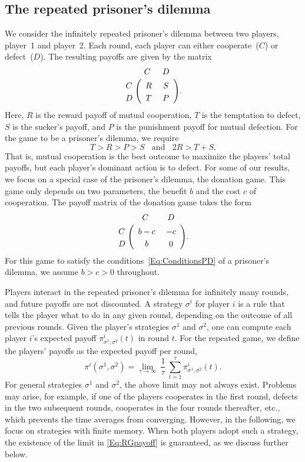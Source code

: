 \documentclass[9pt,twoside,lineno]{pnas-new}
\theoremstyle{plainCl1}
\theoremstyle{plainCl2}
\begin{document}
\subsection{The repeated prisoner's dilemma}


We consider the infinitely repeated prisoner's dilemma between two players, player~1 and player~2.
Each round, each player can either cooperate~($C$) or defect~($D$). 
The resulting payoffs are given by the matrix 
\begin{align}\label{Eq:PrisonerDilemma}
  \bordermatrix{%
    & C & D \cr
    C &\ R &\ S\  \cr
    D &\ T &\ P\ \cr
  }.
\end{align}
Here, $R$ is the reward payoff of mutual cooperation, $T$ is the temptation to defect, $S$ is the sucker's payoff, and $P$ is the punishment payoff for mutual defection. For the game to be a prisoner's dilemma, we require
\begin{equation} \label{Eq:ConditionsPD}
 T > R > P > S ~~~~\text{and}~~~~ 2 R > T \!+\! S. 
\end{equation}
That is, mutual cooperation is the best outcome to maximize the players' total payoffs, but each player's dominant action is to defect. 
For some of our results, we focus on a special case of the prisoner's dilemma, the donation game. 
This game only depends on two parameters, the benefit $b$ and the cost $c$ of cooperation. 
The payoff matrix of the donation game takes the form
\begin{align} \label{Eq:DonationGame}
  \bordermatrix{%
    & C & D \cr
    C &\ b - c &\ -c\  \cr
    D &\ b &\ 0\ \cr
  }.
\end{align}
For this game to satisfy the conditions~\eqref{Eq:ConditionsPD} of a prisoner's dilemma, we assume $b\!>\!c\!>\!0$ throughout. 

Players interact in the repeated prisoner's dilemma for infinitely many rounds, and future payoffs are not discounted. 
A strategy $\sigma^i$ for player $i$ is a rule that tells the player what to do in any given round, depending on the outcome of all previous rounds. 
Given the player's strategies $\sigma^1$ and $\sigma^2$, one can compute each player $i$'s expected payoff $\pi^i_{\sigma^1,\sigma^2}(t)$ in round $t$. 
For the repeated game, we define the players' payoffs as the expected payoff per round, 
\begin{equation} \label{Eq:RGpayoff}
\pi^i(\sigma^1,\sigma^2) = \lim_{\tau \to \infty}~ \frac{1}{\tau} ~\sum_{t=1}^{\tau} \pi_{\sigma^1,\sigma^2}^i(t).
\end{equation}
For general strategies $\sigma^1$ and $\sigma^2$, the above limit may not always exist. 
Problems may arise, for example, if one of the players cooperates in the first round, defects in the two subsequent rounds, cooperates in the four rounds thereafter, etc., which prevents the time averages from converging. 
However, in the following, we focus on strategies with finite memory. 
When both players adopt such a strategy, the existence of the limit in \eqref{Eq:RGpayoff} is guaranteed, as we discuss further below.
\end{document}
